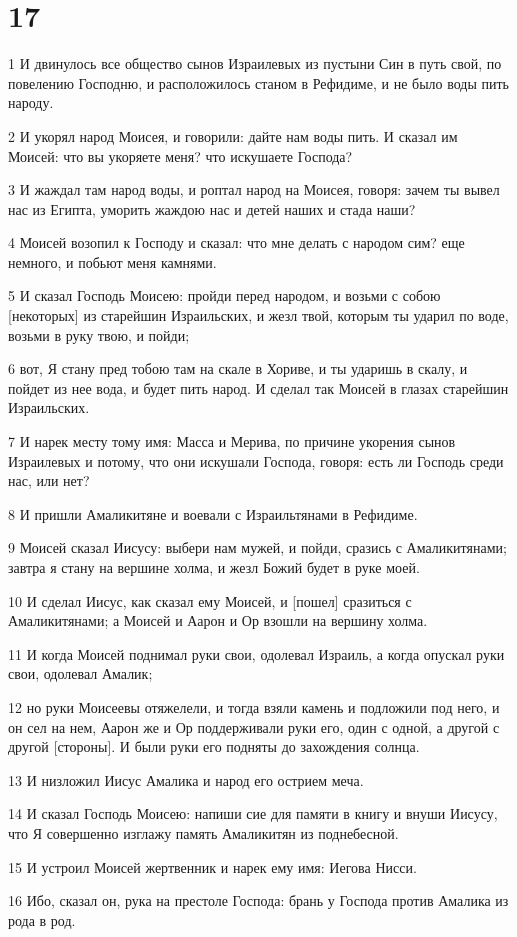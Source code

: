 \chapter{17}

\par 1 И двинулось все общество сынов Израилевых из пустыни Син в путь свой, по повелению Господню, и расположилось станом в Рефидиме, и не было воды пить народу.
\par 2 И укорял народ Моисея, и говорили: дайте нам воды пить. И сказал им Моисей: что вы укоряете меня? что искушаете Господа?
\par 3 И жаждал там народ воды, и роптал народ на Моисея, говоря: зачем ты вывел нас из Египта, уморить жаждою нас и детей наших и стада наши?
\par 4 Моисей возопил к Господу и сказал: что мне делать с народом сим? еще немного, и побьют меня камнями.
\par 5 И сказал Господь Моисею: пройди перед народом, и возьми с собою [некоторых] из старейшин Израильских, и жезл твой, которым ты ударил по воде, возьми в руку твою, и пойди;
\par 6 вот, Я стану пред тобою там на скале в Хориве, и ты ударишь в скалу, и пойдет из нее вода, и будет пить народ. И сделал так Моисей в глазах старейшин Израильских.
\par 7 И нарек месту тому имя: Масса и Мерива, по причине укорения сынов Израилевых и потому, что они искушали Господа, говоря: есть ли Господь среди нас, или нет?
\par 8 И пришли Амаликитяне и воевали с Израильтянами в Рефидиме.
\par 9 Моисей сказал Иисусу: выбери нам мужей, и пойди, сразись с Амаликитянами; завтра я стану на вершине холма, и жезл Божий будет в руке моей.
\par 10 И сделал Иисус, как сказал ему Моисей, и [пошел] сразиться с Амаликитянами; а Моисей и Аарон и Ор взошли на вершину холма.
\par 11 И когда Моисей поднимал руки свои, одолевал Израиль, а когда опускал руки свои, одолевал Амалик;
\par 12 но руки Моисеевы отяжелели, и тогда взяли камень и подложили под него, и он сел на нем, Аарон же и Ор поддерживали руки его, один с одной, а другой с другой [стороны]. И были руки его подняты до захождения солнца.
\par 13 И низложил Иисус Амалика и народ его острием меча.
\par 14 И сказал Господь Моисею: напиши сие для памяти в книгу и внуши Иисусу, что Я совершенно изглажу память Амаликитян из поднебесной.
\par 15 И устроил Моисей жертвенник и нарек ему имя: Иегова Нисси.
\par 16 Ибо, сказал он, рука на престоле Господа: брань у Господа против Амалика из рода в род.

